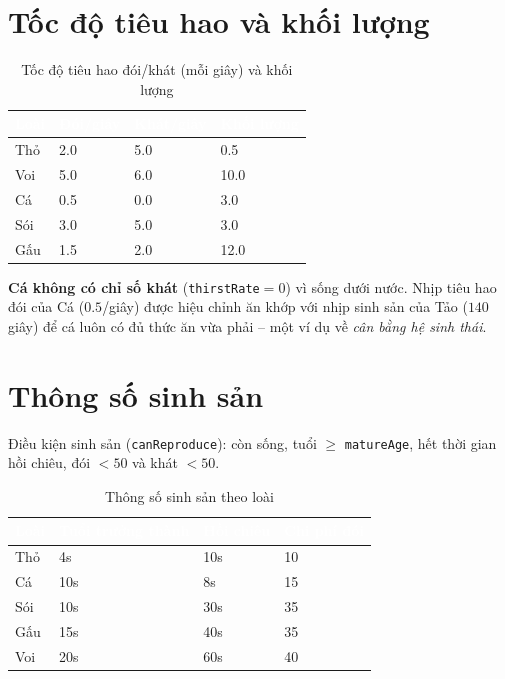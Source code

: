 \documentclass[12pt,a4paper]{report}
\newcommand{\code}[1]{\texttt{\small #1}}
\newcommand{\note}[1]{%
  \begin{mdframed}[backgroundcolor=infobg,linecolor=primaryblue,linewidth=0.8pt,
                   roundcorner=4pt,skipabove=6pt,skipbelow=6pt]#1\end{mdframed}}
\begin{document}
\section{Tốc độ tiêu hao và khối lượng}

\begin{table}[H]
\centering
\caption{Tốc độ tiêu hao đói/khát (mỗi giây) và khối lượng}
\begin{tabular}{L{3cm} C{3cm} C{3cm} C{2.5cm}}
\toprule
{}
\textcolor{white}{\textbf{Loài}} &
\textcolor{white}{\textbf{Đói/giây}} &
\textcolor{white}{\textbf{Khát/giây}} &
\textcolor{white}{\textbf{Khối lượng}} \\
\midrule
Thỏ & 2.0 & 5.0 & 0.5 \\
 Voi & 5.0 & 6.0 & 10.0 \\
Cá & 0.5 & 0.0 & 3.0 \\
 Sói & 3.0 & 5.0 & 3.0 \\
Gấu & 1.5 & 2.0 & 12.0 \\
\bottomrule
\end{tabular}
\end{table}

\note{\textbf{Cá không có chỉ số khát} (\code{thirstRate}$=0$) vì sống dưới nước. Nhịp tiêu hao đói của Cá ($0.5$/giây) được hiệu chỉnh ăn khớp với nhịp sinh sản của Tảo ($140$ giây) để cá luôn có đủ thức ăn vừa phải -- một ví dụ về \textit{cân bằng hệ sinh thái}.}

\section{Thông số sinh sản}

Điều kiện sinh sản (\code{canReproduce}): còn sống, tuổi $\geq$ \code{matureAge}, hết thời gian hồi chiêu, đói $<50$ và khát $<50$.

\begin{table}[H]
\centering
\caption{Thông số sinh sản theo loài}
\begin{tabular}{L{3cm} C{3.5cm} C{3cm} C{2.5cm}}
\toprule
{}
\textcolor{white}{\textbf{Loài}} &
\textcolor{white}{\textbf{Tuổi trưởng thành}} &
\textcolor{white}{\textbf{Hồi chiêu}} &
\textcolor{white}{\textbf{Chi phí đói}} \\
\midrule
Thỏ & 4s & 10s & 10 \\
 Cá & 10s & 8s & 15 \\
Sói & 10s & 30s & 35 \\
 Gấu & 15s & 40s & 35 \\
Voi & 20s & 60s & 40 \\
\bottomrule
\end{tabular}
\end{table}
\end{document}
